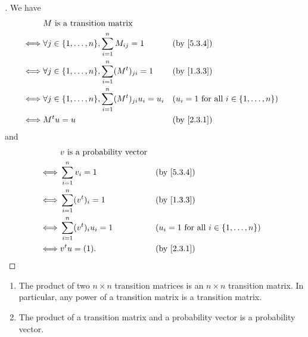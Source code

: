 \begin{proof}[]
  We have
  \begin{align*}
         & M \text{ is a transition matrix}                                                                                                 \\
    \iff & \forall j \in \set{1, \dots, n}, \sum_{i = 1}^n M_{i j} = 1              &  & \by{5.3.4}                                         \\
    \iff & \forall j \in \set{1, \dots, n}, \sum_{i = 1}^n (\tp{M})_{j i} = 1       &  & \by{1.3.3}                                         \\
    \iff & \forall j \in \set{1, \dots, n}, \sum_{i = 1}^n (\tp{M})_{j i} u_i = u_i &  & (u_i = 1 \text{ for all } i \in \set{1, \dots, n}) \\
    \iff & \tp{M} u = u                                                             &  & \by{2.3.1}
  \end{align*}
  and
  \begin{align*}
         & v \text{ is a probability vector}                                                         \\
    \iff & \sum_{i = 1}^n v_i = 1            &  & \by{5.3.4}                                         \\
    \iff & \sum_{i = 1}^n (\tp{v})_i = 1     &  & \by{1.3.3}                                         \\
    \iff & \sum_{i = 1}^n (\tp{v})_i u_i = 1 &  & (u_i = 1 \text{ for all } i \in \set{1, \dots, n}) \\
    \iff & \tp{v} u = (1).                   &  & \by{2.3.1}
  \end{align*}
\end{proof}

\begin{cor}\label{5.3.5}
  \begin{enumerate}
    \item The product of two \(n \times n\) transition matrices is an \(n \times n\) transition matrix.
          In particular, any power of a transition matrix is a transition matrix.
    \item The product of a transition matrix and a probability vector is a probability vector.
  \end{enumerate}
\end{cor}

